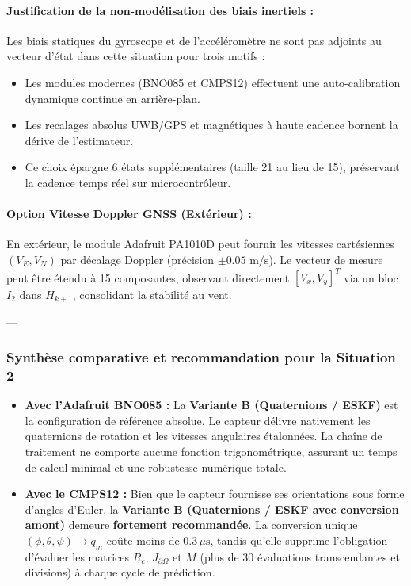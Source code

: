 \documentclass[../Formulations_Kalman.tex]{subfiles}
\begin{document}
\paragraph{Justification de la non-modélisation des biais inertiels :}
Les biais statiques du gyroscope et de l'accéléromètre ne sont pas adjoints au vecteur d'état dans cette situation pour trois motifs :
\begin{itemize}
    \item Les modules modernes (BNO085 et CMPS12) effectuent une auto-calibration dynamique continue en arrière-plan.
    \item Les recalages absolus UWB/GPS et magnétiques à haute cadence bornent la dérive de l'estimateur.
    \item Ce choix épargne 6 états supplémentaires (taille 21 au lieu de 15), préservant la cadence temps réel sur microcontrôleur.
\end{itemize}

\paragraph{Option Vitesse Doppler GNSS (Extérieur) :}
En extérieur, le module Adafruit PA1010D peut fournir les vitesses cartésiennes $(V_E, V_N)$ par décalage Doppler (précision $\pm 0.05\text{ m/s}$). Le vecteur de mesure peut être étendu à 15 composantes, observant directement $[V_x, V_y]^T$ via un bloc $I_2$ dans $H_{k+1}$, consolidant la stabilité au vent.

---

\subsubsection{Synthèse comparative et recommandation pour la Situation 2}
\begin{itemize}
    \item \textbf{Avec l'Adafruit BNO085 :} La \textbf{Variante B (Quaternions / ESKF)} est la configuration de référence absolue. Le capteur délivre nativement les quaternions de rotation et les vitesses angulaires étalonnées. La chaîne de traitement ne comporte aucune fonction trigonométrique, assurant un temps de calcul minimal et une robustesse numérique totale.
    \item \textbf{Avec le CMPS12 :} Bien que le capteur fournisse ses orientations sous forme d'angles d'Euler, la \textbf{Variante B (Quaternions / ESKF avec conversion amont)} demeure \textbf{fortement recommandée}. La conversion unique $(\phi, \theta, \psi) \to q_m$ coûte moins de $0.3\,\mu\text{s}$, tandis qu'elle supprime l'obligation d'évaluer les matrices $R_c$, $J_{\partial\Omega}$ et $M$ (plus de 30 évaluations transcendantes et divisions) à chaque cycle de prédiction.
\end{itemize}
\end{document}
